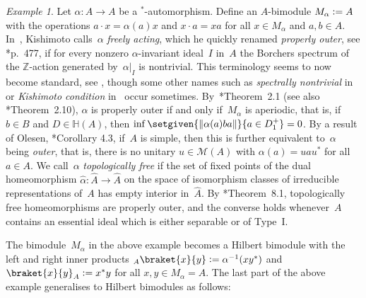 \documentclass[a4paper]{amsart}
\theoremstyle{plain}
\theoremstyle{definition}
\theoremstyle{remark}
\newtheorem{example}[theorem]{Example}
\numberwithin{theorem}{section}
\numberwithin{equation}{section}
\newcommand{\Her}{\mathbb H}%
\newcommand*{\nb}{\nobreakdash}
\newcommand*{\Star}{\(^*\)\nobreakdash-}
\newcommand*{\Z}{\mathbb Z}
\newcommand*{\Mult}{\mathcal M}%
\newcommand*{\defeq}{\mathrel{\vcentcolon=}}%
\DeclarePairedDelimiter{\norm}{\lVert}{\rVert}%
\begin{document}
\begin{example}
  \label{ex:conditions_automorphisms}
  Let \(\alpha\colon A\to A\) be a \Star{}automorphism.
  Define an \(A\)\nb-bimodule \(M_\alpha\defeq A\) with the operations
  \(a\cdot x=\alpha(a)x\) and \(x\cdot a=xa\) for all \(x\in
  M_{\alpha}\) and \(a,b\in A\).
  In~\cite{Kishimoto:Freely_acting}, Kishimoto calls~\(\alpha\)
  \emph{freely acting}, which he quickly renamed \emph{properly
    outer}, see \cite{Hamana:injective-C-dyn}*{p.~477}, if for every
  nonzero \(\alpha\)\nb-invariant ideal~\(I\) in~\(A\) the Borchers
  spectrum of the \(\Z\)\nb-action generated by~\(\alpha|_I\) is
  nontrivial.
  This terminology seems to now become standard, see
  \cites{Hamana:injective-C-dyn, Zarikian:Unique_expectations,
    Zarikian:Unique_pseudo,
    Kennedy-Ursu:Intermediate_subalgebras_crossed}, though some other
  names such as \emph{spectrally nontrivial}
  in~\cite{Pasnicu-Phillips:Spectrally_free} or \emph{Kishimoto
    condition} in~\cite{Kwasniewski-Meyer:Aperiodicity} occur
  sometimes.
  By~\cite{Kishimoto:Freely_acting}*{Theorem~2.1} (see also
  \cite{Kwasniewski-Meyer:Aperiodicity}*{Theorem~2.10}),
  \(\alpha\) is properly outer if and only if~\(M_{\alpha}\) is
  aperiodic, that is, if \(b\in B\) and \(D\in \Her(A)\), then
  \(\inf\setgiven{\norm{\alpha(a)ba}}{ a\in D^+_1}=0\).
  By a result of Olesen, \cite{Olesen:Inner}*{Corollary 4.3}, if~\(A\)
  is simple, then this is further equivalent to~\(\alpha\) being
  \emph{outer}, that is, there is no unitary \(u\in \Mult(A)\) with
  \(\alpha(a)= u a u^*\) for all \(a\in A\).
  We call~\(\alpha\) \emph{topologically free} if the set of fixed
  points of the dual homeomorphism \(\widehat{\alpha}\colon
  \widehat{A}\to \widehat{A}\) on the space of isomorphism classes of
  irreducible representations of~\(A\) has empty interior
  in~\(\widehat{A}\).
  By \cite{Kwasniewski-Meyer:Aperiodicity}*{Theorem~8.1},
  topologically free homeomorphisms are properly outer, and the converse
  holds whenever~\(A\) contains an essential ideal which is either
  separable or of Type~I.
\end{example}

The bimodule~\(M_\alpha\) in the above example becomes a Hilbert
bimodule with the left and right inner products \({}_A\braket{x}{y}
\defeq \alpha^{-1}(xy^*)\) and \(\braket{x}{y}_A\defeq x^*y\) for all
\(x,y\in M_{\alpha}=A\).
The last part of the above example generalises to Hilbert bimodules as
follows:
\end{document}

